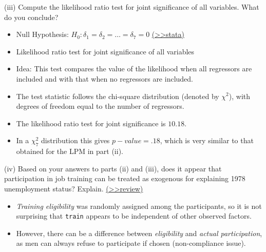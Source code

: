 \documentclass[
  10pt,
  ignorenonframetext,
]{beamer}
\providecommand{\tightlist}{%
  \setlength{\itemsep}{0pt}\setlength{\parskip}{0pt}}
\begin{document}
\begin{frame}{(iii) Compute the likelihood ratio test for joint
significance \quad of all variables. What do you conclude?}
\protect\hypertarget{iii-compute-the-likelihood-ratio-test-for-joint-significance-of-all-variables.-what-do-you-conclude}{}
\begin{itemize}
\item
  Null Hypothesis: \(H_0: \delta_1 = \delta_2 = \ldots = \delta_7 = 0\)
  \footnotesize \protect\hyperlink{PROBITtrain}{(\textgreater\textgreater stata)}
  \normalsize
\item
  Likelihood ratio test for joint significance of all variables
\item
  Idea: This test compares the value of the likelihood when all
  regressors are included and with that when no regressors are included.
\item
  The test statistic follows the chi-square distribution (denoted by
  \(\chi^2\)), with degrees of freedom equal to the number of
  regressors.
\item
  The likelihood ratio test for joint significance is \(10.18\).
\item
  In a \(\chi^2_7\) distribution this gives \(p-value = .18\), which is
  very similar to that obtained for the LPM in part (ii).
\end{itemize}
\end{frame}

\begin{frame}[fragile]{(iv) Based on your answers to parts (ii) and
(iii), does it appear that participation in job training can be treated
as exogenous for explaining 1978 unemployment status? Explain.}
\protect\hypertarget{Ex1-iv}{}
\footnotesize \protect\hyperlink{RA}{(\textgreater\textgreater review)}
\normalsize

\begin{itemize}
\tightlist
\item
  \emph{Training eligibility} was randomly assigned among the
  participants, so it is not surprising that \texttt{train} appears to
  be independent of other observed factors.
\end{itemize}

\vspace{0.8mm}

\begin{itemize}
\tightlist
\item
  However, there can be a difference between \emph{eligibility} and
  \emph{actual participation}, as men can always refuse to participate
  if chosen (non-compliance issue).
\end{itemize}
\end{frame}
\end{document}
